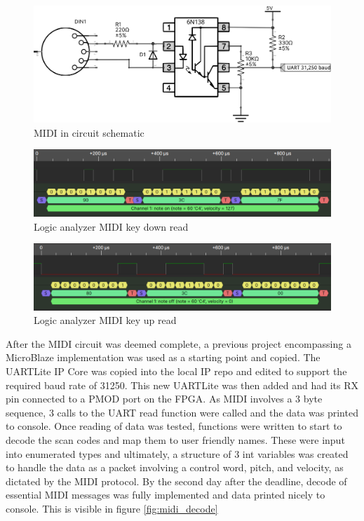 \documentclass[12pt]{article}
\begin{document}
\begin{figure}[!htb]
    \centering
    \includegraphics[width=\textwidth]{img/midi_in_schematic.png}
    \caption{MIDI in circuit schematic}
    \label{fig:midi_in_schematic}
\end{figure}

\begin{figure}[!htb]
    \centering
    \includegraphics[width=\textwidth]{img/logic_analyzer_key_down.png}
    \caption{Logic analyzer MIDI key down read}
    \label{fig:logic_key_down}
\end{figure}

\begin{figure}[!htb]
    \centering
    \includegraphics[width=\textwidth]{img/logic_analyzer_key_up.png}
    \caption{Logic analyzer MIDI key up read}
    \label{fig:logic_key_up}
\end{figure}

After the MIDI circuit was deemed complete, a previous project encompassing a MicroBlaze implementation was used as a starting point and copied. The UARTLite IP Core was copied into the local IP repo and edited to support the required baud rate of 31250. This new UARTLite was then added and had its RX pin connected to a PMOD port on the FPGA. As MIDI involves a 3 byte sequence, 3 calls to the UART read function were called and the data was printed to console. Once reading of data was tested, functions were written to start to decode the scan codes and map them to user friendly names. These were input into enumerated types and ultimately, a structure of 3 int variables was created to handle the data as a packet involving a control word, pitch, and velocity, as dictated by the MIDI protocol. By the second day after the deadline, decode of essential MIDI messages was fully implemented and data printed nicely to console. This is visible in figure \ref{fig:midi_decode}
\end{document}

